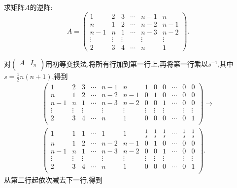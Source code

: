 \documentclass[lang=cn,newtx,10pt,scheme=chinese]{elegantbook}
\begin{document}
\begin{exercise}
求矩阵\(A\)的逆阵:
\[
A = 
\begin{pmatrix}
1 & 2 & 3 & \cdots & n - 1 & n \\
n & 1 & 2 & \cdots & n - 2 & n - 1 \\
n - 1 & n & 1 & \cdots & n - 3 & n - 2 \\
\vdots & \vdots & \vdots & & \vdots & \vdots \\
2 & 3 & 4 & \cdots & n & 1
\end{pmatrix}.
\]
\end{exercise}
\begin{solution}
对\(\left( \begin{matrix}
A&		I_n\\
\end{matrix} \right) \)用初等变换法,将所有行加到第一行上,再将第一行乘以\(s^{-1}\),其中\(s = \frac{1}{2}n(n + 1)\),得到
\setcounter{MaxMatrixCols}{20} %
\begin{gather*}
\left( \begin{matrix}
1&		2&		3&		\cdots&		n-1&		n&		1&		0&		0&		\cdots&		0&		0\\
n&		1&		2&		\cdots&		n-2&		n-1&		0&		1&		0&		\cdots&		0&		0\\
n-1&		n&		1&		\cdots&		n-3&		n-2&		0&		0&		1&		\cdots&		0&		0\\
\vdots&		\vdots&		\vdots&		&		\vdots&		\vdots&		\vdots&		\vdots&		\vdots&		&		\vdots&		\vdots\\
2&		3&		4&		\cdots&		n&		1&		0&		0&		0&		\cdots&		0&		1\\
\end{matrix} \right) \rightarrow
\\
\left( \begin{matrix}
1&		1&		1&		\cdots&		1&		1&		\frac{1}{s}&		\frac{1}{s}&		\frac{1}{s}&		\cdots&		\frac{1}{s}&		\frac{1}{s}\\
n&		1&		2&		\cdots&		n-2&		n-1&		0&		1&		0&		\cdots&		0&		0\\
n-1&		n&		1&		\cdots&		n-3&		n-2&		0&		0&		1&		\cdots&		0&		0\\
\vdots&		\vdots&		\vdots&		&		\vdots&		\vdots&		\vdots&		\vdots&		\vdots&		&		\vdots&		\vdots\\
2&		3&		4&		\cdots&		n&		1&		0&		0&		0&		\cdots&		0&		1\\
\end{matrix} \right) .
\end{gather*}
从第二行起依次减去下一行,得到
\begin{gather*}

\end{gather*}
\end{solution}
\end{document}
